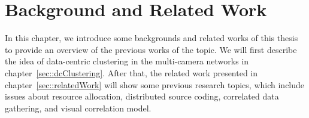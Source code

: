 \section{Background and Related Work}
\label{sec::backgroundAndRelatedWork}
In this chapter, we introduce some backgrounds and related works of this thesis to provide an overview of the previous works of the topic.
We will first describe the idea of data-centric clustering in the multi-camera networks in chapter~\ref{sec::dcClustering}.
After that, the related work presented in chapter~\ref{sec::relatedWork} will show some previous research topics, which include issues about resource allocation, distributed source coding, correlated data gathering, and visual correlation model.

